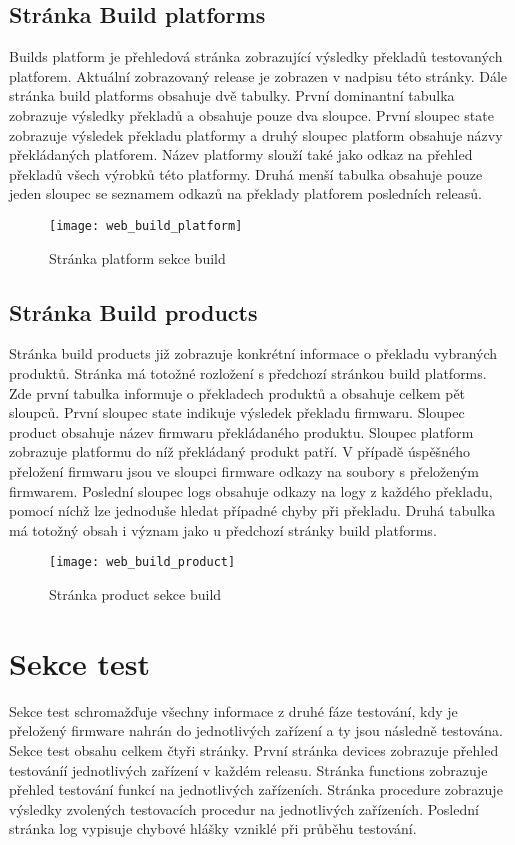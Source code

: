 \subsection{Stránka Build platforms}
Builds platform je přehledová stránka zobrazující výsledky překladů testovaných platforem. Aktuální zobrazovaný release je zobrazen v nadpisu této stránky. Dále stránka build platforms obsahuje dvě tabulky. První dominantní tabulka zobrazuje výsledky překladů a obsahuje pouze dva sloupce. První sloupec state zobrazuje výsledek překladu platformy a druhý sloupec platform obsahuje názvy překládaných platforem. Název platformy slouží také jako odkaz na přehled překladů všech výrobků této platformy. Druhá menší tabulka obsahuje pouze jeden sloupec se seznamem odkazů na překlady platforem posledních releasů.

\begin{figure}[h]
  \centering
  \texttt{[image: web\_build\_platform]}
  \caption{Stránka platform sekce build}
  \label{fig:web_build_platform}
\end{figure}

\subsection{Stránka Build products}
Stránka build products již zobrazuje konkrétní informace o překladu vybraných produktů. Stránka má totožné rozložení s předchozí stránkou build platforms. Zde první tabulka informuje o překladech produktů a obsahuje celkem pět sloupců. První sloupec state indikuje výsledek překladu firmwaru. Sloupec product obsahuje název firmwaru překládaného produktu. Sloupec platform zobrazuje platformu do níž překládaný produkt patří. V případě úspěšného přeložení firmwaru jsou ve sloupci firmware odkazy na soubory s přeloženým firmwarem. Poslední sloupec logs obsahuje odkazy na logy z každého překladu, pomocí níchž lze jednoduše hledat případné chyby při překladu. Druhá tabulka má totožný obsah i význam jako u předchozí stránky build platforms.

\begin{figure}[h]
  \centering
  \texttt{[image: web\_build\_product]}
  \caption{Stránka product sekce build}
  \label{fig:web_build_platform}
\end{figure}

\section{Sekce test}
Sekce test schromažďuje všechny informace z druhé fáze testování, kdy je přeložený firmware nahrán do jednotlivých zařízení a ty jsou následně testována. Sekce test obsahu celkem čtyři stránky. První stránka devices zobrazuje přehled testováníí jednotlivých zařízení v každém releasu. Stránka functions zobrazuje přehled testování funkcí na jednotlivých zařízeních. Stránka procedure zobrazuje výsledky zvolených testovacích procedur na jednotlivých zařízeních. Poslední stránka log vypisuje chybové hlášky vzniklé při průběhu testování.

